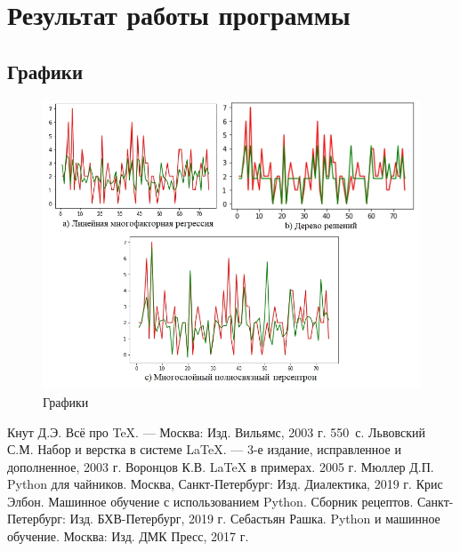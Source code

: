 \documentclass[12pt,a4paper]{scrartcl}
\begin{document}
	\section{Результат работы программы}
	\label{sec:result}
	
	\subsection{Графики}
	\label{sec:result:screen}
	\begin{figure}[h]
	\centering
	\includegraphics[width=1\textwidth]{result.jpg}
	\caption{Графики}\label{figure:screen}
	\end{figure}

	\begin{thebibliography}{9}
	Кнут Д.Э. Всё про \TeX. \newblock --- Москва: Изд. Вильямс, 2003 г. 550~с.
	Львовский С.М. Набор и верстка в системе \LaTeX{}. \newblock --- 3-е издание, исправленное и дополненное, 2003 г.
	Воронцов К.В. \LaTeX{} в примерах. 2005 г.
	Мюллер Д.П. Python для чайников. Москва, Санкт-Петербург: Изд. Диалектика, 2019 г.
	Крис Элбон. Машинное обучение с использованием Python. Сборник рецептов. Санкт-Петербург: Изд. БХВ-Петербург, 2019 г.
	Себастьян Рашка. Python и машинное обучение. Москва: Изд. ДМК Пресс, 2017 г.
	\end{thebibliography}
	
\end{document}
